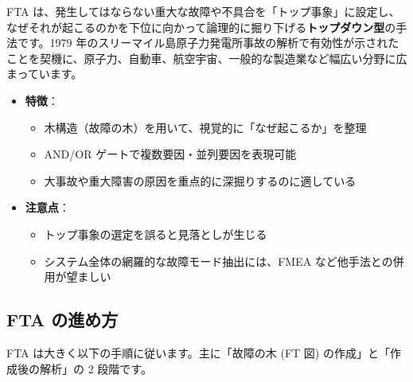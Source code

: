 FTA は、発生してはならない重大な故障や不具合を「トップ事象」に設定し、なぜそれが起こるのかを下位に向かって論理的に掘り下げる\textbf{トップダウン型}の手法です。1979 年のスリーマイル島原子力発電所事故の解析で有効性が示されたことを契機に、原子力、自動車、航空宇宙、一般的な製造業など幅広い分野に広まっています。

\begin{itemize}
 \item \textbf{特徴}：
   \begin{itemize}
    \item 木構造（故障の木）を用いて、視覚的に「なぜ起こるか」を整理
    \item AND/OR ゲートで複数要因・並列要因を表現可能
    \item 大事故や重大障害の原因を重点的に深掘りするのに適している
   \end{itemize}
 \item \textbf{注意点}：
   \begin{itemize}
    \item トップ事象の選定を誤ると見落としが生じる
    \item システム全体の網羅的な故障モード抽出には、FMEA など他手法との併用が望ましい
   \end{itemize}
\end{itemize}

\subsection{FTA の進め方}

FTA は大きく以下の手順に従います。主に「故障の木 (FT 図) の作成」と「作成後の解析」の 2 段階です。

